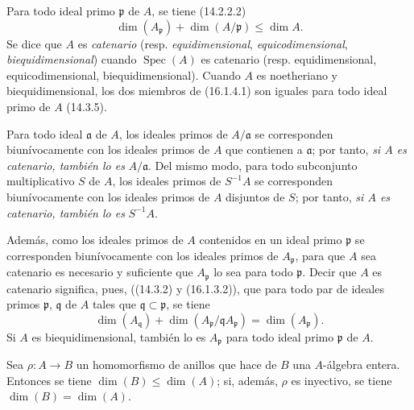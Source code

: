 \begin{env}[16.1.4]
\label{0.16.1.4-es}
Para todo ideal primo $\mathfrak{p}$ de $A$, se tiene (14.2.2.2)
\[
\label{0.16.1.4.1-es}
  \dim(A_{\mathfrak{p}})+\dim(A/\mathfrak{p})\leq\dim A.
\tag{16.1.4.1}
\]
Se dice que $A$ es \emph{catenario} (resp. \emph{equidimensional}, \emph{equicodimensional},
\emph{biequidimensional}) cuando $\operatorname{Spec}(A)$ es catenario (resp.
equidimensional,
equicodimensional, biequidimensional). Cuando $A$ es noetheriano y
biequidimensional, los dos miembros de (16.1.4.1) son iguales para todo ideal
primo de $A$ (14.3.5).

Para todo ideal $\mathfrak{a}$ de $A$, los ideales primos de
$A/\mathfrak{a}$ se corresponden biunívocamente con los ideales primos de $A$
que contienen a $\mathfrak{a}$; por tanto, \emph{si $A$ es catenario, también lo es}
$A/\mathfrak{a}$. Del mismo modo, para todo subconjunto multiplicativo $S$ de
$A$, los ideales primos de $S^{-1}A$ se corresponden biunívocamente con los
ideales primos de $A$ disjuntos de $S$; por tanto, \emph{si $A$ es catenario, también
lo es} $S^{-1}A$.

Además, como los ideales primos de $A$ contenidos en un ideal primo
$\mathfrak{p}$ se corresponden biunívocamente con los ideales primos de
$A_{\mathfrak{p}}$, para que $A$ sea catenario es necesario y suficiente que
$A_{\mathfrak{p}}$ lo sea para todo $\mathfrak{p}$. Decir que $A$ es catenario
significa, pues, ((14.3.2) y (16.1.3.2)), que para todo par de ideales primos
$\mathfrak{p}$, $\mathfrak{q}$ de $A$ tales que
$\mathfrak{q}\subset\mathfrak{p}$, se tiene
\[
\label{0.16.1.4.2-es}
  \dim(A_{\mathfrak{q}})
  +\dim(A_{\mathfrak{p}}/\mathfrak{q}A_{\mathfrak{p}})
  =\dim(A_{\mathfrak{p}}).
\tag{16.1.4.2}
\]
Si $A$ es biequidimensional, también lo es $A_{\mathfrak{p}}$ para todo ideal
primo $\mathfrak{p}$ de $A$.
\end{env}

\begin{proposition}[16.1.5]
\label{0.16.1.5-es}
Sea $\rho:A\to B$ un homomorfismo de anillos que hace de $B$ una $A$-álgebra
entera. Entonces se tiene $\dim(B)\leq\dim(A)$; si, además, $\rho$ es
inyectivo, se tiene $\dim(B)=\dim(A)$.
\end{proposition}

